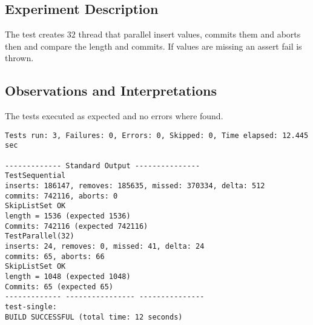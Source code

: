\subsection{Experiment Description} 
\par
The test creates $32$ thread that parallel insert values, commits them and aborts then and compare the length and commits.
If values are missing an assert fail is thrown.
\par



\subsection{Observations and Interpretations}

\par
The tests executed as expected and no errors where found.
\begin{lstlisting}[frame=single,breaklines=true]
Tests run: 3, Failures: 0, Errors: 0, Skipped: 0, Time elapsed: 12.445 sec

------------- Standard Output ---------------
TestSequential
inserts: 186147, removes: 185635, missed: 370334, delta: 512
commits: 742116, aborts: 0
SkipListSet OK
length = 1536 (expected 1536)
Commits: 742116 (expected 742116)
TestParallel(32)
inserts: 24, removes: 0, missed: 41, delta: 24
commits: 65, aborts: 66
SkipListSet OK
length = 1048 (expected 1048)
Commits: 65 (expected 65)
------------- ---------------- ---------------
test-single:
BUILD SUCCESSFUL (total time: 12 seconds)
\end{lstlisting}





